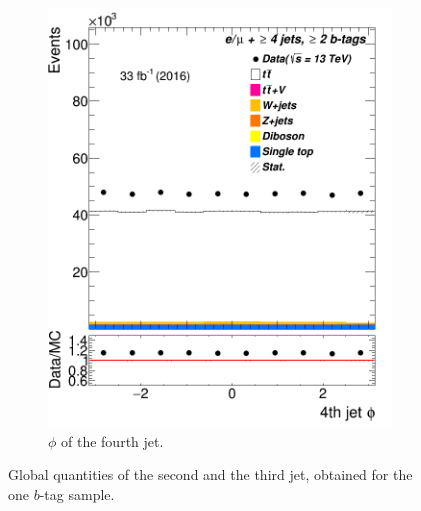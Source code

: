 \begin{figure}
\begin{subfigure}{0.25\textwidth}
	\includegraphics[width=\linewidth]{ControlPlots_emujets_2016_4incl_2incl/jet3_phi_emujets_2016.png}
	\caption{$\phi$ of the fourth jet.} \label{fig:4dd}
\end{subfigure}


\caption{Global quantities of the second and the third jet, obtained for the one $b$-tag sample.}
\end{figure}	

